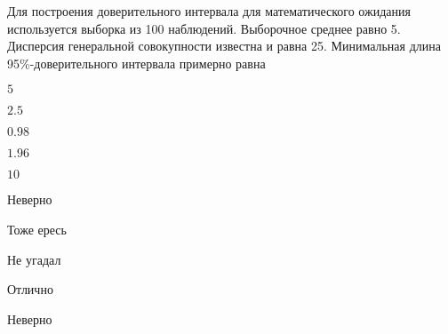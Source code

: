 
\begin{question}
Для построения доверительного интервала для математического ожидания
используется выборка из 100 наблюдений. Выборочное среднее равно 5.
Дисперсия генеральной совокупности известна и равна 25. Минимальная
длина 95\%-доверительного интервала примерно равна
\begin{answerlist}
  \item \(5\)
  \item \(2.5\)
  \item \(0.98\)
  \item \(1.96\)
  \item \(10\)
\end{answerlist}
\end{question}

\begin{solution}
\begin{answerlist}
  \item Неверно
  \item Тоже ересь
  \item Не угадал
  \item Отлично
  \item Неверно
\end{answerlist}
\end{solution}

